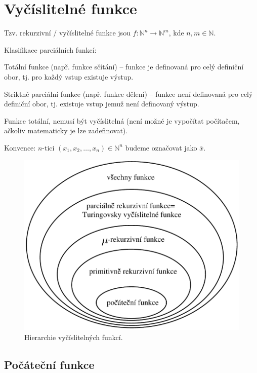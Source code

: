 \section{Vyčíslitelné funkce}

\begin{compactitem}
    \item Tzv. rekurzivní / vyčíslitelné funkce jsou $ f : \mathbb{N}^n \rightarrow \mathbb{N}^m $, kde $n, m \in \mathbb{N}$.

    \item Klasifikace parciálních funkcí: \begin{compactitem}
        \item Totální funkce (např. funkce sčítání) -- funkce je definovaná pro celý definiční obor, tj. pro každý vstup existuje výstup.

        \item Striktně parciální funkce (např. funkce dělení) -- funkce není definovaná pro celý definiční obor, tj. existuje vstup jemuž není definovaný výstup.
    \end{compactitem}

    \item Funkce totální, nemusí být vyčíslitelná (není možné je vypočítat počítačem, ačkoliv matematicky je lze zadefinovat).

    \item Konvence: $n$-tici $(x_1, x_2, \dots, x_n) \in \mathbb{N}^n$ budeme označovat jako $\bar{x}$.
\end{compactitem}

\begin{figure}[H]
    \centering
    \includegraphics[width=0.6\linewidth]{funkce_hierarchie.pdf}
    \caption{Hierarchie vyčíslitelných funkcí.}
\end{figure}

\subsection{Počáteční funkce}

